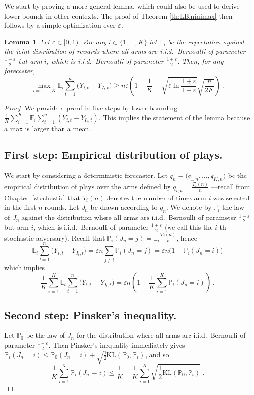 \documentclass[11pt]{hackednow}
\newtheorem{lemma}{Lemma}[chapter]
\newcommand{\K}{\mathrm{KL}}
\renewcommand{\P}{\mathbb{P}}
\newcommand{\E}{\mathbb{E}}
\renewcommand{\epsilon}{\varepsilon}
\begin{document}
We start by proving a more general lemma, which could also be used to derive lower bounds in other contexts. The proof of Theorem \ref{th:LBminimax} then follows by a simple optimization over $\epsilon$.
\begin{lemma} \label{lem:LBminimax}
Let $\epsilon \in [0,1)$. For any $i \in \{1,\hdots, K\}$ let $\E_i$ be the expectation against the joint distribution of rewards where all arms are i.i.d.\ Bernoulli of parameter $\frac{1-\epsilon}{2}$ but arm $i$, which is i.i.d.\ Bernoulli of parameter $\frac{1+\epsilon}{2}$. Then, for any forecaster,
$$\max_{i = 1, \hdots, K}  \E_i \sum_{t=1}^n \bigl(Y_{i,t} - Y_{I_t,t}\bigr) \geq n \epsilon \left(1 - \frac{1}{K} - \sqrt{\epsilon \ln\frac{1+\epsilon}{1-\epsilon}}  \sqrt{\frac{n}{2 K}}\right)~.$$
\end{lemma}
\begin{proof}
We provide a proof in five steps by lower bounding $\frac{1}{K} \sum_{i=1}^K \E_i \sum_{t=1}^n (Y_{i,t} - Y_{I_t,t})$. This implies the statement of the lemma because a max is larger than a mean.
\subsection*{First step: Empirical distribution of plays.}
We start by considering a deterministic forecaster. Let $q_n=\bigl(q_{1,n},\hdots,q_{K,n}\bigr)$ be the empirical distribution of plays over the arms defined by $q_{i,n} = \frac{T_i(n)}{n}$ ---recall from Chapter~\ref{stochastic} that $T_i(n)$ denotes the number of times arm $i$ was selected in the first $n$ rounds. Let $J_n$ be drawn according to $q_n$. We denote by $\P_i$ the law of $J_n$ against the distribution where all arms are i.i.d.\ Bernoulli of parameter $\frac{1-\epsilon}{2}$ but arm $i$, which is i.i.d.\ Bernoulli of parameter $\frac{1+\epsilon}{2}$ (we call this the $i$-th stochastic adversary). Recall that $\P_{i}(J_n = j) = \E_i\tfrac{T_j(n)}{n}$, hence
$$\E_i \sum_{t=1}^n \bigl(Y_{i,t} - Y_{I_t,t}\bigr) = \epsilon n \sum_{j \neq i} \P_{i}(J_n = j) = \epsilon n \bigl(1 - \P_{i}(J_n = i)\bigr)$$
which implies
\begin{equation} \label{eq:firststepmm}
\frac{1}{K} \sum_{i=1}^K \E_i \sum_{t=1}^n \bigl(Y_{i,t} - Y_{I_t,t}\bigr) = \epsilon n \left(1 - \frac{1}{K} \sum_{i=1}^K \P_{i}(J_n = i)\right)~.
\end{equation}

\subsection*{Second step: Pinsker's inequality.}
Let $\P_0$ be the law of $J_n$ for the distribution where all arms are i.i.d.\ Bernoulli of parameter $\frac{1-\epsilon}{2}$. Then Pinsker's inequality immediately gives $\P_{i}(J_n = i) \le \P_{0}(J_n = i) + \sqrt{\tfrac{1}{2} \K(\P_{0},\P_{i})}$, and so
\begin{equation} \label{eq:secondstepmm}
\frac{1}{K} \sum_{i=1}^K \P_{i}(J_n = i) \leq \frac{1}{K} +  \frac{1}{K} \sum_{i=1}^K \sqrt{\frac{1}{2} \K(\P_{0}, \P_{i})}~.
\end{equation}


\end{proof}
\end{document}
